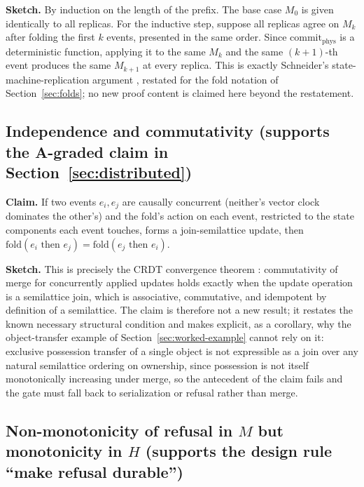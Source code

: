\documentclass[11pt]{article}
\begin{document}
\textbf{Sketch.} By induction on the length of the prefix. The base case $M_0$ is given identically to all replicas. For the inductive step, suppose all replicas agree on $M_{k}$ after folding the first $k$ events, presented in the same order. Since $\mathrm{commit}_{\mathrm{phys}}$ is a deterministic function, applying it to the same $M_k$ and the same $(k+1)$-th event produces the same $M_{k+1}$ at every replica. This is exactly Schneider's state-machine-replication argument \cite{schneider1990}, restated for the fold notation of Section~\ref{sec:folds}; no new proof content is claimed here beyond the restatement.

\subsection{Independence and commutativity (supports the A-graded claim in Section~\ref{sec:distributed})}

\textbf{Claim.} If two events $e_i, e_j$ are causally concurrent (neither's vector clock dominates the other's) and the fold's action on each event, restricted to the state components each event touches, forms a join-semilattice update, then $\mathrm{fold}(e_i \text{ then } e_j) = \mathrm{fold}(e_j \text{ then } e_i)$.

\textbf{Sketch.} This is precisely the CRDT convergence theorem \cite{shapiro2011}: commutativity of merge for concurrently applied updates holds exactly when the update operation is a semilattice join, which is associative, commutative, and idempotent by definition of a semilattice. The claim is therefore not a new result; it restates the known necessary structural condition and makes explicit, as a corollary, why the object-transfer example of Section~\ref{sec:worked-example} cannot rely on it: exclusive possession transfer of a single object is not expressible as a join over any natural semilattice ordering on ownership, since possession is not itself monotonically increasing under merge, so the antecedent of the claim fails and the gate must fall back to serialization or refusal rather than merge.

\subsection{Non-monotonicity of refusal in $M$ but monotonicity in $H$ (supports the design rule ``make refusal durable'')}
\end{document}
